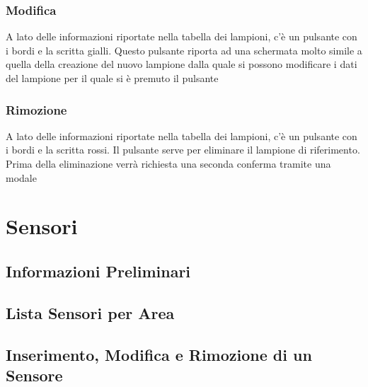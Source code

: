\documentclass[a4paper, 12pt]{article}
\begin{document}
\subsubsection{Modifica}
A lato delle informazioni riportate nella tabella dei lampioni, c'è un pulsante con i bordi e la scritta gialli. Questo pulsante riporta ad una schermata molto simile a quella della creazione del nuovo lampione dalla quale si possono modificare i dati del lampione per il quale si è premuto il pulsante

\subsubsection{Rimozione}
A lato delle informazioni riportate nella tabella dei lampioni, c'è un pulsante con i bordi e la scritta rossi. Il pulsante serve per eliminare il lampione di riferimento. Prima della eliminazione verrà richiesta una seconda conferma tramite una modale

\newpage
\section{Sensori}
\subsection{Informazioni Preliminari}
\subsection{Lista Sensori per Area}
\subsection{Inserimento, Modifica e Rimozione di un Sensore}
\end{document}
